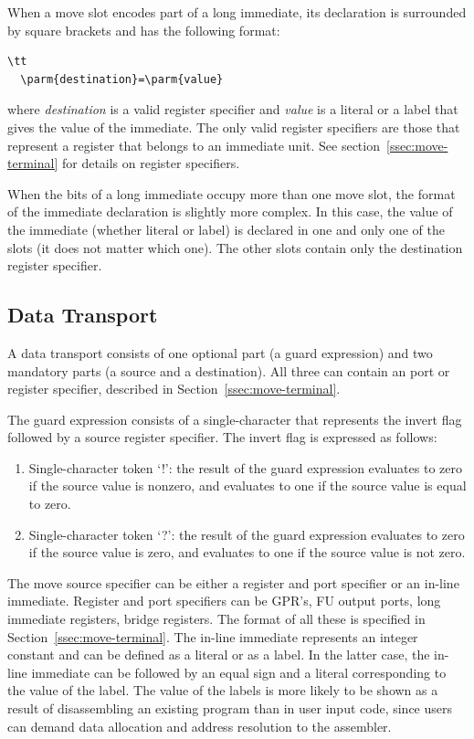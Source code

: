 \documentclass[twoside]{tceusermanual}
\begin{document}
When a move slot encodes part of a long immediate, its declaration is
surrounded by square brackets and has the following format:

\begin{verbatim}\tt
  \parm{destination}=\parm{value}
\end{verbatim}

where \emph{destination} is a valid register specifier and \emph{value} is a
literal or a label that gives the value of the immediate.  The only valid
register specifiers are those that represent a register that belongs to an
immediate unit.  See section~\ref{ssec:move-terminal} for details on
register specifiers.

When the bits of a long immediate occupy more than one move slot, the format
of the immediate declaration is slightly more complex.  In this case, the
value of the immediate (whether literal or label) is declared in one and
only one of the slots (it does not matter which one). The other slots
contain only the destination register specifier.

\subsection{Data Transport}

A data transport consists of one optional part (a guard expression) and two
mandatory parts (a source and a destination). All three can contain an port
or register specifier, described in Section~\ref{ssec:move-terminal}.

The guard expression consists of a single-character that represents the
invert flag followed by a source register specifier. The invert flag is
expressed as follows:
\begin{enumerate}
\item %
  Single-character token `!': the result of the guard expression evaluates
  to zero if the source value is nonzero, and evaluates to one if the source
  value is equal to zero.
\item %
  Single-character token `?': the result of the guard expression evaluates
  to zero if the source value is zero, and evaluates to one if the source
  value is not zero.
\end{enumerate}

The move source specifier can be either a register and port specifier or an
in-line immediate. Register and port specifiers can be GPR's, FU output
ports, long immediate registers, bridge registers. The format of all these
is specified in Section~\ref{ssec:move-terminal}.
%
The in-line immediate represents an integer constant and can be defined as a
literal or as a label. In the latter case, the in-line immediate can be
followed by an equal sign and a literal corresponding to the value of the
label.  The value of the labels is more likely to be shown as a result of
disassembling an existing program than in user input code, since users can
demand data allocation and address resolution to the assembler.
\end{document}

